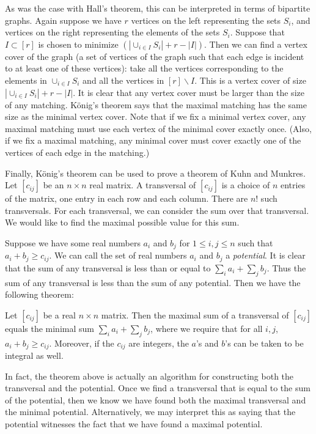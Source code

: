 \documentclass[ALCO,ThmDefs,Unicode,epreuves]{cedram}
\begin{document}
As was the case with Hall's theorem, this can be interpreted in terms of bipartite graphs. Again suppose we have $r$ vertices on the left representing the sets $S_i$, and vertices on the right representing the elements of the sets $S_i$. Suppose that $I \subset [r]$ is chosen to minimize $\left( \left| \cup_{i\in I} S_i \right| + r - |I| \right).$ Then we can find a vertex cover of the graph (a set of vertices of the graph such that each edge is incident to at least one of these vertices): take all the vertices corresponding to the elements in $\cup_{i\in I} S_i$ and all the vertices in $[r] \backslash I$. This is a vertex cover of size $\left| \cup_{i\in I} S_i \right| + r - |I|$. It is clear that any vertex cover must be larger than the size of any matching. K{\"o}nig's theorem says that the maximal matching has the same size as the minimal vertex cover. Note that if we fix a minimal vertex cover, any maximal matching must use each vertex of the minimal cover exactly once. (Also, if we fix a maximal matching, any minimal cover must cover exactly one of the vertices of each edge in the matching.)

Finally, K{\"o}nig's theorem can be used to prove a theorem of Kuhn and Munkres. Let $[c_{ij}]$ be an $n \times n$ real matrix. A transversal of $[c_{ij}]$ is a choice of $n$ entries of the matrix, one entry in each row and each column. There are $n!$ such transversals. For each transversal, we can consider the sum over that transversal. We would like to find the maximal possible value for this sum.

Suppose we have some real numbers $a_i$ and $b_j$ for $1 \leq i,j \leq n$ such that $a_i + b_j \geq c_{ij}$. We can call the set of real numbers $a_i$ and $b_j$ a \emph{potential}. It is clear that the sum of any transversal is less than or equal to $\sum_i a_i + \sum_j b_j$. Thus the sum of any transversal is less than the sum of any potential. Then we have the following theorem:

\begin{theorem} \label{comb3}
Let $[c_{ij}]$ be a real $n\times n$ matrix. Then the maximal sum of a transversal of $[c_{ij}]$ equals the minimal sum $\sum_i a_i + \sum_j b_j$, where we require that for all $i, j$, $a_i + b_j \geq c_{ij}$. Moreover, if the $c_{ij}$ are integers, the $a$'s and $b$'s can be taken to be integral as well.
\end{theorem}

In fact, the theorem above is actually an algorithm for constructing both the transversal and the potential. Once we find a transversal that is equal to the sum of the potential, then we know we have found both the maximal transversal and the minimal potential. Alternatively, we may interpret this as saying that the potential witnesses the fact that we have found a maximal potential.
\end{document}
